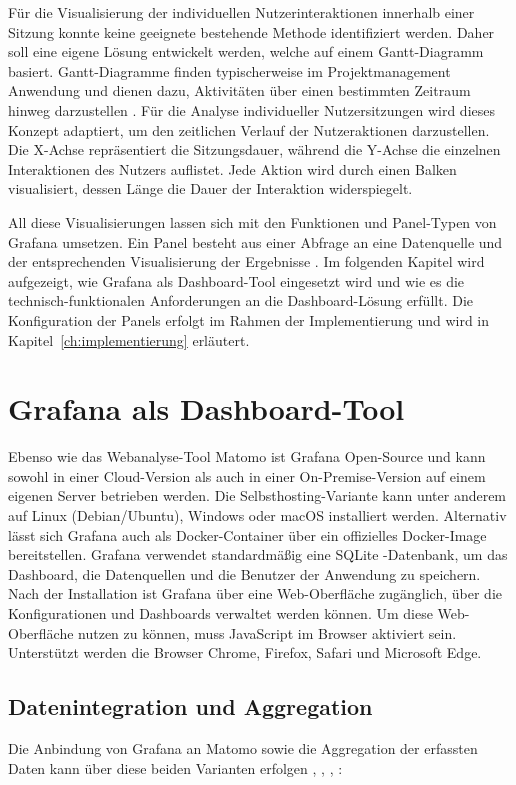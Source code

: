 Für die Visualisierung der individuellen Nutzerinteraktionen innerhalb einer Sitzung konnte keine geeignete bestehende Methode identifiziert werden. Daher soll eine eigene Lösung entwickelt werden, welche auf einem Gantt-Diagramm basiert. Gantt-Diagramme finden typischerweise im Projektmanagement Anwendung und dienen dazu, Aktivitäten über einen bestimmten Zeitraum hinweg darzustellen \parencite{GanttCom}. Für die Analyse individueller Nutzersitzungen wird dieses Konzept adaptiert, um den zeitlichen Verlauf der Nutzeraktionen darzustellen. Die X-Achse repräsentiert die Sitzungsdauer, während die Y-Achse die einzelnen Interaktionen des Nutzers auflistet. Jede Aktion wird durch einen Balken visualisiert, dessen Länge die Dauer der Interaktion widerspiegelt.

All diese Visualisierungen lassen sich mit den Funktionen und Panel-Typen von Grafana umsetzen. Ein Panel besteht aus einer Abfrage an eine Datenquelle und der entsprechenden Visualisierung der Ergebnisse \parencite{GrafanaPanel}. Im folgenden Kapitel wird aufgezeigt, wie Grafana als Dashboard-Tool eingesetzt wird und wie es die technisch-funktionalen Anforderungen an die Dashboard-Lösung erfüllt. Die Konfiguration der Panels erfolgt im Rahmen der Implementierung und wird in Kapitel~\ref{ch:implementierung} erläutert.

\section{Grafana als Dashboard-Tool}
Ebenso wie das Webanalyse-Tool Matomo ist Grafana Open-Source und kann sowohl in einer Cloud-Version als auch in einer On-Premise-Version auf einem eigenen Server betrieben werden. Die Selbsthosting-Variante kann unter anderem auf Linux (Debian/Ubuntu), Windows oder macOS installiert werden. Alternativ lässt sich Grafana auch als Docker-Container über ein offizielles Docker-Image bereitstellen. Grafana verwendet standardmäßig eine SQLite -Datenbank, um das Dashboard, die Datenquellen und die Benutzer der Anwendung zu speichern. Nach der Installation ist Grafana über eine Web-Oberfläche zugänglich, über die Konfigurationen und Dashboards verwaltet werden können. Um diese Web-Oberfläche nutzen zu können, muss JavaScript im Browser aktiviert sein. Unterstützt werden die Browser Chrome, Firefox, Safari und Microsoft Edge. \parencite{GrafanaLabsInstall}

\subsection{Datenintegration und Aggregation}
Die Anbindung von Grafana an Matomo sowie die Aggregation der erfassten Daten kann über diese beiden Varianten erfolgen \parencite{Verteuil2022}, \parencite{MatomoDBConnection}, \parencite{MatomoReportingAPI}, \parencite{MatomoDBSchema}:

